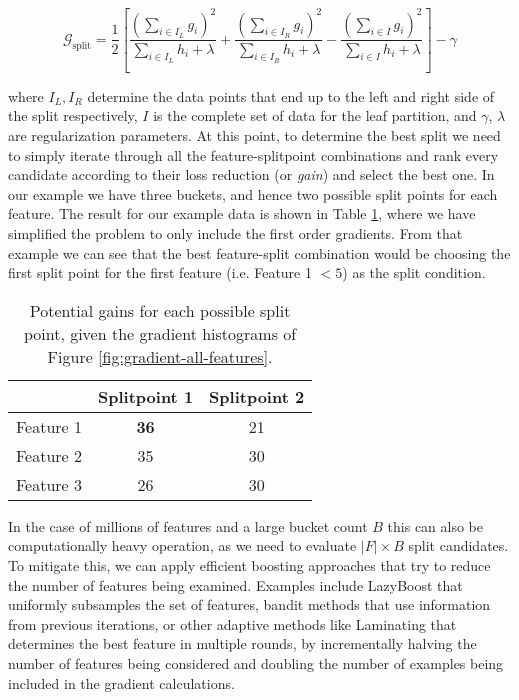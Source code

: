 \begin{equation}
	\mathcal{G}_{\text{split}} = \frac{1}{2} \left[\frac{\left(\sum_{i \in I_{L}} g_{i} \right)^{2}} {\sum_{i \in I_{L}} h_{i}+ \lambda} + \frac{\left(\sum_{i \in I_{R}} g_{i} \right)^{2}}{\sum_{i \in I_{R}} h_{i} + \lambda} - \frac{\left(\sum_{i \in I}g_{i}\right)^{2}}{\sum_{i \in I}h_{i}+\lambda}\right]-\gamma
\end{equation}

\noindent
where $I_L, I_R$ determine the data points that end up to the left and right side of the split
respectively, $I$ is the complete set of data for the leaf partition, and $\gamma$, $\lambda$ are
regularization parameters. At this point, to determine
the best split we need to simply iterate through all the feature-splitpoint combinations
and rank every candidate according to their loss reduction (or \textit{gain}) and select the
best one. In our example we have three buckets, and hence two possible split points for each feature. The result for our example data is shown in Table \ref{tab:gains}, where
we have simplified the problem to only include the first order gradients. From that example
we can see that the best feature-split combination would be choosing the first split
point for the first feature (i.e. Feature 1 $< 5$) as the split condition.

\begin{table}
	\centering
	\begin{tabular}{ccc}
		\toprule
		& Splitpoint 1 & Splitpoint 2 \\
		\midrule
		Feature 1 & \textbf{36} & 21 \\
		Feature 2 & 35 & 30 \\
		Feature 3 & 26 & 30 \\
		\bottomrule
	\end{tabular}
	\caption{Potential gains for each possible split point, given
	the gradient histograms of Figure \ref{fig:gradient-all-features}.}
	\label{tab:gains}
\end{table}

In the case of millions of features and a large bucket count $B$ this can also be
computationally heavy operation, as we need to evaluate $|F| \times B$ split candidates.
To mitigate this, we can apply efficient boosting approaches that try
to reduce the number of features being examined. Examples include LazyBoost \cite{lazyboost}
that uniformly subsamples the set of features,
bandit methods \cite{bandits-boosting} that use information from previous iterations, or other adaptive
methods like Laminating \cite{laminating} that determines the best feature in multiple rounds, by incrementally
halving the number of features being considered and doubling the number of examples being
included in the gradient calculations.

